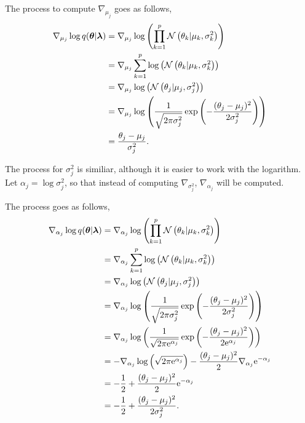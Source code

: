 The process to compute $\nabla_{\mu_j}$ goes as follows,
\begin{equation}
  \begin{split}
      \nabla_{\mu_j} \log q(\boldsymbol{\theta} | \boldsymbol{\lambda}) & =
      \nabla_{\mu_j} \log \left( \prod_{ k = 1}^p \mathcal{N}\left( \theta_k | \mu_k, \sigma_k^2 \right) \right) \\
      &= \nabla_{\mu_j} \sum_{ k = 1}^p \log \left( \mathcal{N}\left( \theta_k | \mu_k, \sigma_k^2 \right) \right) \\
      &= \nabla_{\mu_j} \log \left( \mathcal{N}\left( \theta_j | \mu_j, \sigma_j^2 \right) \right) \\
      &= \nabla_{\mu_j} \log \left( \frac{1}{\sqrt{2 \pi \sigma_j^2}} \exp \left( -\frac{(\theta_j - \mu_j)^2}{2 \sigma_j^2} \right) \right) \\
      &= \frac{\theta_j - \mu_j}{\sigma_j^2}.
  \end{split}
\end{equation}

The process for $\sigma_j^2$ is similiar, although it is easier to work with the logarithm. Let $\alpha_j = \log \sigma_j^2$, so that instead of computing $\nabla_{\sigma_j^2}$, $\nabla_{\alpha_j}$ will be computed.

The process goes as follows,
\begin{equation}
  \begin{split}
      \nabla_{\alpha_j} \log q(\boldsymbol{\theta} | \boldsymbol{\lambda}) & =
      \nabla_{\alpha_j} \log \left( \prod_{ k = 1}^p \mathcal{N}\left( \theta_k | \mu_k, \sigma_k^2 \right) \right) \\
      &= \nabla_{\alpha_j} \sum_{ k = 1}^p \log \left( \mathcal{N}\left( \theta_k | \mu_k, \sigma_k^2 \right) \right) \\
      &= \nabla_{\alpha_j} \log \left( \mathcal{N}\left( \theta_j | \mu_j, \sigma_j^2 \right) \right) \\
      &= \nabla_{\alpha_j} \log \left( \frac{1}{\sqrt{2 \pi \sigma_j^2}} \exp \left( -\frac{(\theta_j - \mu_j)^2}{2 \sigma_j^2} \right) \right) \\
      &= \nabla_{\alpha_j} \log \left( \frac{1}{\sqrt{2 \pi \mathrm{e}^{\alpha_j}}} \exp \left( -\frac{(\theta_j - \mu_j)^2}{2 \mathrm{e}^{\alpha_j}} \right) \right) \\
      &= - \nabla_{\alpha_j} \log \left( \sqrt{2 \pi \mathrm{e}^{\alpha_j}} \right) - \frac{(\theta_j - \mu_j)^2}{2} \nabla_{\alpha_j} \mathrm{e}^{-\alpha_j}\\
      &= - \frac{1}{2} + \frac{(\theta_j - \mu_j)^2}{2} \mathrm{e}^{-\alpha_j} \\
      &= - \frac{1}{2} + \frac{(\theta_j - \mu_j)^2}{2 \sigma_j^2}.
  \end{split}
\end{equation}

